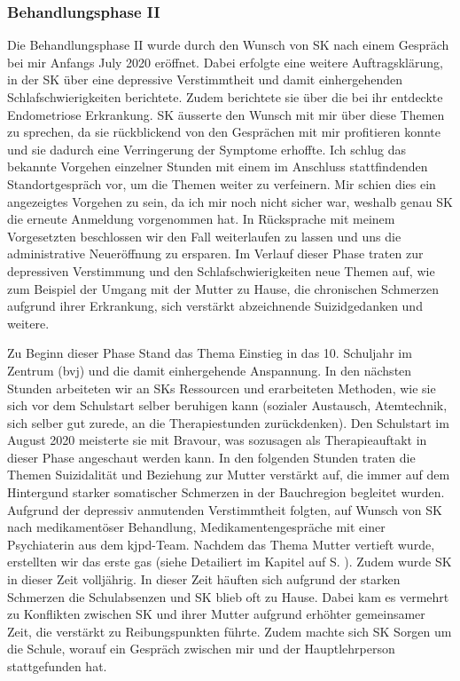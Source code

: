 \subsubsection{Behandlungsphase II}
Die Behandlungsphase II wurde durch den Wunsch von SK nach einem Gespräch bei mir Anfangs July 2020 eröffnet. Dabei erfolgte eine weitere Auftragsklärung, in der SK über eine depressive Verstimmtheit und damit einhergehenden Schlafschwierigkeiten berichtete. Zudem berichtete sie über die bei ihr entdeckte Endometriose Erkrankung. SK äusserte den Wunsch mit mir über diese Themen zu sprechen, da sie rückblickend von den Gesprächen mit mir profitieren konnte und sie dadurch eine Verringerung der Symptome erhoffte. Ich schlug das bekannte Vorgehen einzelner Stunden mit einem im Anschluss stattfindenden Standortgespräch vor, um die Themen weiter zu verfeinern. Mir schien dies ein angezeigtes Vorgehen zu sein, da ich mir noch nicht sicher war, weshalb genau SK die erneute Anmeldung vorgenommen hat. In Rücksprache mit meinem Vorgesetzten beschlossen wir den Fall weiterlaufen zu lassen und uns die administrative Neueröffnung zu ersparen. Im Verlauf dieser Phase traten zur depressiven Verstimmung und den Schlafschwierigkeiten neue Themen auf, wie zum Beispiel der Umgang mit der Mutter zu Hause, die chronischen Schmerzen aufgrund ihrer Erkrankung, sich verstärkt abzeichnende Suizidgedanken und weitere.

Zu Beginn dieser Phase Stand das Thema Einstieg in das 10. Schuljahr im Zentrum (\ac{bvj}) und die damit einhergehende Anspannung. In den nächsten Stunden arbeiteten wir an SKs Ressourcen und erarbeiteten Methoden, wie sie sich vor dem Schulstart selber beruhigen kann (sozialer Austausch, Atemtechnik, sich selber gut zurede, an die Therapiestunden zurückdenken). Den Schulstart im August 2020 meisterte sie mit Bravour, was sozusagen als Therapieauftakt in dieser Phase angeschaut werden kann. In den folgenden Stunden traten die Themen Suizidalität und Beziehung zur Mutter verstärkt auf, die immer auf dem Hintergund starker somatischer Schmerzen in der Bauchregion begleitet wurden. Aufgrund der depressiv anmutenden Verstimmtheit folgten, auf Wunsch von SK nach medikamentöser Behandlung, Medikamentengespräche mit einer Psychiaterin aus dem \ac{kjpd}-Team. Nachdem das Thema Mutter vertieft wurde, erstellten wir das erste \ac{gas} (siehe Detailiert im Kapitel  auf S. \pageref{sec:Evaluationsverfahren}). Zudem wurde SK in dieser Zeit volljährig. In dieser Zeit häuften sich aufgrund der starken Schmerzen die Schulabsenzen und SK blieb oft zu Hause. Dabei kam es vermehrt zu Konflikten zwischen SK und ihrer Mutter aufgrund erhöhter gemeinsamer Zeit, die verstärkt zu Reibungspunkten führte. Zudem machte sich SK Sorgen um die Schule, worauf ein Gespräch zwischen mir und der Hauptlehrperson stattgefunden hat. 

